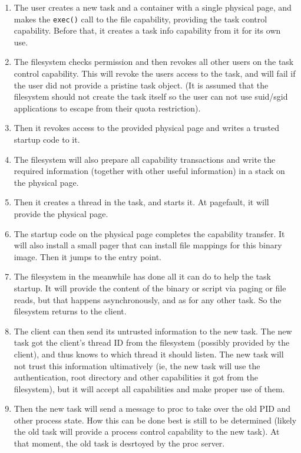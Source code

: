 \documentclass[9pt,a4paper]{extarticle}
\begin{document}
\begin{enumerate}
\item The user creates a new task and a container with a single
  physical page, and makes the \texttt{exec()} call to the file
  capability, providing the task control capability.  Before that, it
  creates a task info capability from it for its own use.
\item The filesystem checks permission and then revokes all other
  users on the task control capability.  This will revoke the users
  access to the task, and will fail if the user did not provide a
  pristine task object.  (It is assumed that the filesystem should not
  create the task itself so the user can not use suid/sgid
  applications to escape from their quota restriction).
\item Then it revokes access to the provided physical page and writes
  a trusted startup code to it.
\item The filesystem will also prepare all capability transactions and
  write the required information (together with other useful
  information) in a stack on the physical page.
\item Then it creates a thread in the task, and starts it.  At
  pagefault, it will provide the physical page.
\item The startup code on the physical page completes the capability
  transfer.  It will also install a small pager that can install file
  mappings for this binary image.  Then it jumps to the entry point.
\item The filesystem in the meanwhile has done all it can do to help
  the task startup.  It will provide the content of the binary or
  script via paging or file reads, but that happens asynchronously,
  and as for any other task.  So the filesystem returns to the client.
\item The client can then send its untrusted information to the new
  task.  The new task got the client's thread ID from the filesystem
  (possibly provided by the client), and thus knows to which thread it
  should listen.  The new task will not trust this information
  ultimatively (ie, the new task will use the authentication, root
  directory and other capabilities it got from the filesystem), but it
  will accept all capabilities and make proper use of them.
\item Then the new task will send a message to proc to take over the
  old PID and other process state.  How this can be done best is still
  to be determined (likely the old task will provide a process control
  capability to the new task).  At that moment, the old task is
  desrtoyed by the proc server.
\end{enumerate}
\end{document}
